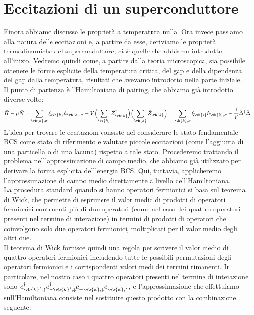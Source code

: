 \section{Eccitazioni di un superconduttore}
Finora abbiamo discusso le proprietà a temperatura nulla. Ora invece passiamo alla natura delle eccitazioni e, a partire da esse, deriviamo le proprietà termodinamiche del superconduttore, cioè quelle che abbiamo introdotto all'inizio. Vedremo quindi come, a partire dalla teoria microscopica, sia possibile ottenere le forme esplicite della temperatura critica, del gap e della dipendenza del gap dalla temperatura, risultati che avevamo introdotto nella parte iniziale.\\
Il punto di partenza è l'Hamiltoniana di pairing, che abbiamo già introdotto diverse volte:
\begin{equation*}
   \hat{H} - \mu \hat{N}
   =
   \sum_{\vb{k},\sigma} \xi_{\vb{k}} \hat{n}_{\vb{k},\sigma}
   - V
   \Bigl( \sum_{\vb{k}} \hat{Z}^{\dag}_{\vb{k}} \Bigr)
   \Bigl( \sum_{\vb{k}} \hat{Z}_{\vb{k}} \Bigr)
   =
   \sum_{\vb{k},\sigma} \xi_{\vb{k}} \hat{n}_{\vb{k},\sigma}
   - \frac{1}{V} \hat{\Delta}^{\dag} \hat{\Delta}
\end{equation*}
L'idea per trovare le eccitazioni consiste nel considerare lo stato fondamentale BCS come stato di riferimento e valutare piccole eccitazioni (come l'aggiunta di una particella o di una lacuna) rispetto a tale stato. Procederemo trattando il problema nell'approssimazione di campo medio, che abbiamo già utilizzato per derivare la forma esplicita dell'energia BCS. Qui, tuttavia, applicheremo l'approssimazione di campo medio direttamente a livello dell'Hamiltoniana.\\
La procedura standard quando si hanno operatori fermionici si basa sul teorema di Wick, che permette di esprimere il valor medio di prodotti di operatori fermionici contenenti più di due operatori (come nel caso dei quattro operatori presenti nel termine di interazione) in termini di prodotti di operatori che coinvolgono solo due operatori fermionici, moltiplicati per il valor medio degli altri due.\\
Il teorema di Wick fornisce quindi una regola per scrivere il valor medio di quattro operatori fermionici includendo tutte le possibili permutazioni degli operatori fermionici e i corrispondenti valori medi dei termini rimanenti. In particolare, nel nostro caso i quattro operatori presenti nel termine di interazione sono $c^{\dag}_{\vb{k}',\uparrow} c^{\dag}_{-\vb{k}',\downarrow} c^{\vphantom{\dag}}_{-\vb{k},\downarrow} c^{\vphantom{\dag}}_{\vb{k},\uparrow}$, e l'approssimazione che effettuiamo sull'Hamiltoniana consiste nel sostituire questo prodotto con la combinazione seguente:
